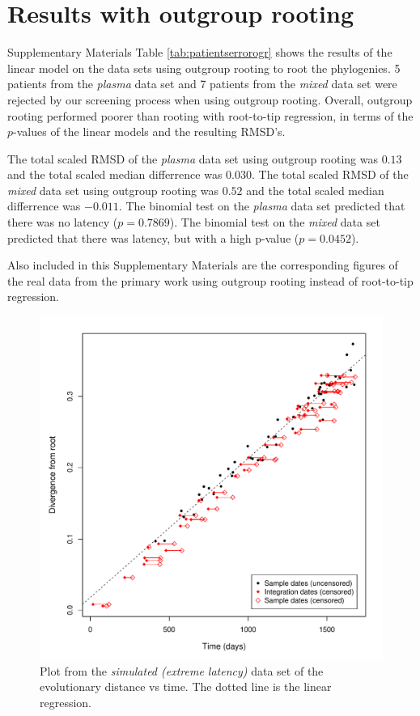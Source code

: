 \documentclass[12pt]{article}
\begin{document}
\section{Results with outgroup rooting} \label{sec:ogr}
Supplementary Materials Table \ref{tab:patientserrorogr} shows the results of the linear model on the data sets using outgroup rooting \citep{Huelsenbeck02} to root the phylogenies.
5 patients from the \emph{plasma} data set and 7 patients from the \emph{mixed} data set were rejected by our screening process when using outgroup rooting.
Overall, outgroup rooting performed poorer than rooting with root-to-tip regression, in terms of the $p$-values of the linear models and the resulting RMSD's.

The total scaled RMSD of the \emph{plasma} data set using outgroup rooting was $0.13$ and the total scaled median differrence was $0.030$.
The total scaled RMSD of the \emph{mixed} data set using outgroup rooting was $0.52$ and the total scaled median differrence was $-0.011$.
The binomial test on the \emph{plasma} data set predicted that there was no latency ($p = 0.7869$).
The binomial test on the \emph{mixed} data set predicted that there was latency, but with a high p-value ($p = 0.0452$).

Also included in this Supplementary Materials are the corresponding figures of the real data from the primary work using outgroup rooting instead of root-to-tip regression.






\begin{figure}[ht]
	\centering
	\includegraphics[width=12cm]{figures/simulated_extreme.pdf}
	\caption[Simulated Data]{Plot from the \emph{simulated (extreme latency)} data set of the evolutionary distance vs time. The dotted line is the linear regression.}
	\label{fig:resultsextreme}
\end{figure}
\end{document}
